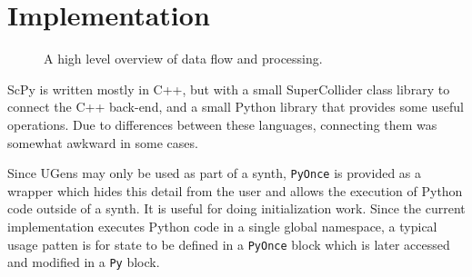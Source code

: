 \documentclass{article}
\begin{document}
\section{Implementation}\label{sec:implementation}

\begin{figure}[ht]
    \caption{A high level overview of data flow and processing.}
    \begin{center}
    \end{center}
\end{figure}

ScPy is written mostly in C++, but with a small SuperCollider class library to connect the C++
back-end, and a small Python library that provides some useful operations. Due to differences
between these languages, connecting them was somewhat awkward in some cases.

Since UGens may only be used as part of a synth, \texttt{PyOnce} is provided as a wrapper which
hides this detail from the user and allows the execution of Python code outside of a synth. It is
useful for doing initialization work. Since the current implementation executes Python code in a
single global namespace, a typical usage patten is for state to be defined in a \texttt{PyOnce}
block which is later accessed and modified in a \texttt{Py} block.
\end{document}
